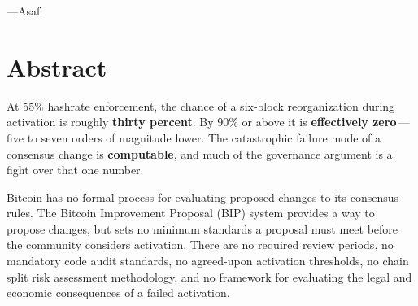 \documentclass[11pt, twoside, openright]{book}
\begin{document}
\bigskip

\hfill---Asaf

\cleardoublepage

\tableofcontents
\cleardoublepage

\chapter*{Abstract}

\begin{tcolorbox}[colback=bitcoinorange!6, colframe=bitcoinorange!60, boxrule=0.7pt,
  arc=2.5pt, left=10pt, right=10pt, top=8pt, bottom=8pt, before skip=2pt, after skip=12pt]
{\centering
At 55\% hashrate enforcement, the chance of a six-block reorganization during activation is roughly \textbf{thirty percent}. By 90\% or above it is \textbf{effectively zero}\,---\,five to seven orders of magnitude lower. The catastrophic failure mode of a consensus change is \textbf{computable}, and much of the governance argument is a fight over that one number.\par}
\end{tcolorbox}

Bitcoin has no formal process for evaluating proposed changes to its consensus rules. The Bitcoin Improvement Proposal (BIP) system provides a way to propose changes, but sets no minimum standards a proposal must meet before the community considers activation. There are no required review periods, no mandatory code audit standards, no agreed-upon activation thresholds, no chain split risk assessment methodology, and no framework for evaluating the legal and economic consequences of a failed activation.
\end{document}
